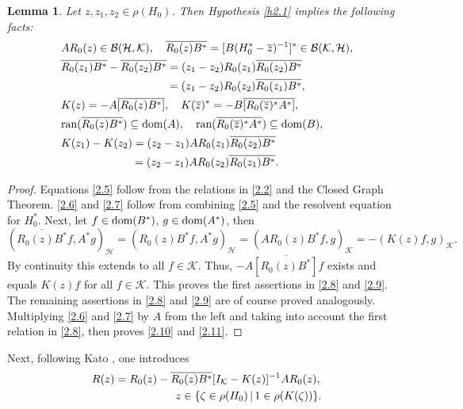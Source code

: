 \documentclass[reqno,10pt, centertags]{amsart}
\newcounter{count}
\newcommand{\cB}{{\mathcal B}}
\newcommand{\cH}{{\mathcal H}}
\newcommand{\cK}{{\mathcal K}}
\newcommand{\lb}{\label}
\newcommand{\ol}{\overline}
\newcommand{\ran}{\text{\rm{ran}}}
\newcommand{\dom}{\text{\rm{dom}}}
\numberwithin{equation}{section}
\newtheorem{lemma}[theorem]{Lemma}
\theoremstyle{definition}
\begin{document}
\begin{lemma} \lb{l2.1}
Let $z,z_1,z_2\in\rho(H_0)$. Then  Hypothesis \ref{h2.1} implies the
following facts:
\begin{align}
& AR_0(z)\in\cB(\cH,\cK), \quad \ol{R_0(z)B^*}=[B(H_0^*-\ol z)^{-1}]^*\in
\cB(\cK,\cH), \lb{2.5}
\\ & \ol{R_0(z_1)B^*}-\ol{R_0(z_2)B^*}
=(z_1-z_2)R_0(z_1)\ol{R_0(z_2)B^*} \lb{2.6} \\
& \hspace*{3.35cm} =(z_1-z_2)R_0(z_2)\ol{R_0(z_1)B^*}, \lb{2.7} \\
& K(z)=-A\ol{[R_0(z)B^*]}, \quad K(\ol z)^*=-B\ol{[R_0(\ol z)^*A^*]},
\lb{2.8} \\
& \ran(\ol{R_0(z)B^*})\subseteq \dom(A), \quad
\ran(\ol{R_0(\ol z)^*A^*})\subseteq \dom(B), \lb{2.9} \\
& K(z_1)-K(z_2)=(z_2-z_1)AR_0(z_1)\ol{R_0(z_2)B^*} \lb{2.10} \\
& \hspace*{2.25cm} =(z_2-z_1)AR_0(z_2)\ol{R_0(z_1)B^*}. \lb{2.11}
\end{align}
\end{lemma}
\begin{proof}
Equations \eqref{2.5} follow from the relations in
\eqref{2.2} and the Closed Graph Theorem. \eqref{2.6} and \eqref{2.7}
follow from combining
\eqref{2.5} and the resolvent equation for $H_0^*$. Next, let
$f\in\dom(B^*)$, $g\in\dom(A^*)$, then
\begin{equation}
(\ol{R_0(z)B^*}f,A^*g)_{\cH}=(R_0(z)B^*f,A^*g)_{\cH}
=(AR_0(z)B^*f,g)_{\cK}=-(K(z)f,g)_{\cK}. \lb{2.12}
\end{equation}
By continuity this extends to all $f\in\cK$. Thus,
$-A\ol{[R_0(z)B^*]}f$ exists and equals $K(z)f$ for all $f\in\cK$.
This proves the first assertions in \eqref{2.8} and \eqref{2.9}. The
remaining assertions in \eqref{2.8} and \eqref{2.9} are of course
proved analogously. Multiplying \eqref{2.6} and \eqref{2.7} by $A$
from the left and taking into account the first relation in
\eqref{2.8}, then proves
\eqref{2.10} and \eqref{2.11}.
\end{proof}

Next, following Kato \cite{Ka66}, one introduces
\begin{align}
\begin{split}
& R(z)=R_0(z)-\ol{R_0(z)B^*}[I_{\cK}-K(z)]^{-1}AR_0(z), \lb{2.13} \\
& \hspace*{2.65cm} z\in\{\zeta\in\rho(H_0)\,|\, 1\in\rho(K(\zeta))\}.
\end{split}
\end{align}
\end{document}
